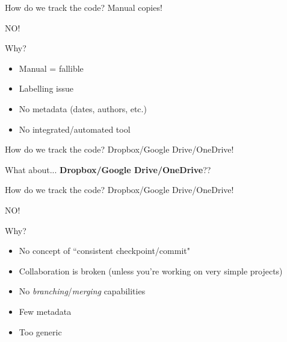 \begin{frame}[fragile]{How do we track the code? Manual copies!}

\begin{center}
\Huge NO!
\end{center}

Why?
\begin{itemize}
  \item Manual = fallible
  \item Labelling issue
  \item No metadata (dates, authors, etc.)
  \item No integrated/automated tool
\end{itemize}

\end{frame}

\begin{frame}[fragile]{How do we track the code? Dropbox/Google Drive/OneDrive!}

What about... \textbf{Dropbox/Google Drive/OneDrive}??

\end{frame}

\begin{frame}[fragile]{How do we track the code? Dropbox/Google Drive/OneDrive!}

\begin{center}
\Huge NO!
\end{center}

Why?
\begin{itemize}
  \item No concept of ``consistent checkpoint/commit"
  \item Collaboration is broken (unless you're working on very simple projects)
  \item No \textit{branching}/\textit{merging} capabilities
  \item Few metadata
  \item Too generic
\end{itemize}

\end{frame}

